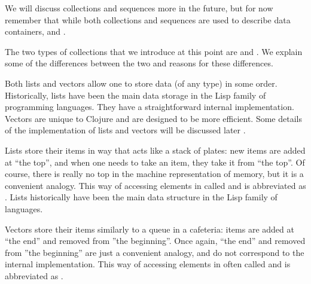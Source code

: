 We will discuss collections and sequences more in the future, but for now remember that while both collections and sequences are used to describe data containers,  and . 

The two types of collections that we introduce at this point are  and . We explain some of the differences between the two and reasons for these differences. 

Both lists and vectors allow one to store data (of any type) in some order. Historically, lists have been the main data storage in the Lisp family of programming languages. They have a straightforward internal implementation. Vectors are unique to Clojure and are designed to be more efficient. Some details of the implementation of lists and vectors will be discussed later . 

Lists store their items in way that acts like a stack of plates: new items are added at ``the top'', and when one needs to take an item, they take it from ``the top''.  Of course, there is really no top in the machine representation of memory, but it is a convenient analogy.  This way of accessing elements in called  and is abbreviated as . Lists historically have been the main data structure in the Lisp family of languages. 

Vectors store their items similarly to a queue in a cafeteria: items are added at ``the end'' and removed from ''the beginning''. Once again, ``the end'' and removed from ''the beginning'' are just a convenient analogy, and do not correspond to the internal implementation. This way of accessing elements in often called  and is abbreviated as . 

